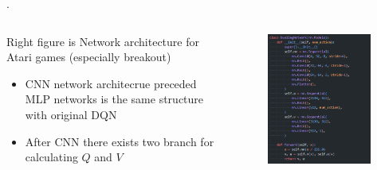 \documentclass[8pt]{beamer}
\begin{document}
\begin{frame}{.}
    \begin{columns}
        \begin{column}{0.45\textwidth}
            Right figure is Network architecture for Atari games (especially breakout)
            \begin{itemize}
                \item CNN network architecrue preceded MLP networks is the same structure with original DQN
                \item After CNN there exists two branch for calculating $Q$ and $V$
            \end{itemize}
        \end{column}
        \begin{column}{0.55\textwidth}
            \begin{figure}
                \includegraphics[width=0.95\textwidth]{DuelingDQNNetwork.png}
            \end{figure}
        \end{column}
    \end{columns}
\end{frame}
\end{document}
